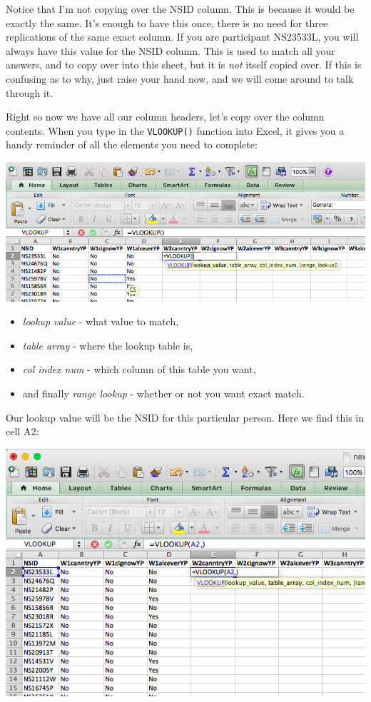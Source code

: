 \documentclass[]{book}
\providecommand{\tightlist}{%
  \setlength{\itemsep}{0pt}\setlength{\parskip}{0pt}}
\theoremstyle{definition}
\theoremstyle{definition}
\theoremstyle{definition}
\theoremstyle{remark}
\begin{document}
Notice that I'm not copying over the NSID column. This is because it
would be exactly the same. It's enough to have this once, there is no
need for three replications of the same exact column. If you are
participant NS23533L, you will always have this value for the NSID
column. This is used to match all your answers, and to copy over into
this sheet, but it is \emph{not} itself copied over. If this is
confusing as to why, just raise your hand now, and we will come around
to talk through it.

Right so now we have all our column headers, let's copy over the column
contents. When you type in the \texttt{VLOOKUP()} function into Excel,
it gives you a handy reminder of all the elements you need to complete:

\includegraphics{imgs/vlookup_hints.png}

\begin{itemize}
\tightlist
\item
  \emph{lookup value} - what value to match,
\item
  \emph{table array} - where the lookup table is,
\item
  \emph{col index num} - which column of this table you want,
\item
  and finally \emph{range lookup} - whether or not you want exact match.
\end{itemize}

Our lookup value will be the NSID for this particular person. Here we
find this in cell A2:

\includegraphics{imgs/lookup_val_nsid.png}
\end{document}
